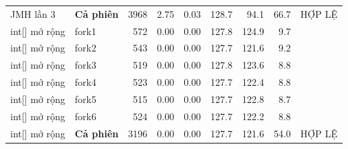 \begin{longtable}{llrrrrrrl}
JMH lần 3 & \textbf{Cả phiên} & \num{3968} & 2.75 & 0.03 & 128.7 & 94.1 & 66.7 & HỢP LỆ \\
int[] mở rộng & fork1 & \num{572} & 0.00 & 0.00 & 127.8 & 124.9 & 9.7 &  \\
int[] mở rộng & fork2 & \num{543} & 0.00 & 0.00 & 127.7 & 121.6 & 9.2 &  \\
int[] mở rộng & fork3 & \num{519} & 0.00 & 0.00 & 127.8 & 123.6 & 8.8 &  \\
int[] mở rộng & fork4 & \num{523} & 0.00 & 0.00 & 127.7 & 122.4 & 8.8 &  \\
int[] mở rộng & fork5 & \num{515} & 0.00 & 0.00 & 127.7 & 122.8 & 8.7 &  \\
int[] mở rộng & fork6 & \num{524} & 0.00 & 0.00 & 127.7 & 122.2 & 8.8 &  \\
int[] mở rộng & \textbf{Cả phiên} & \num{3196} & 0.00 & 0.00 & 127.7 & 121.6 & 54.0 & HỢP LỆ \\
\end{longtable}
